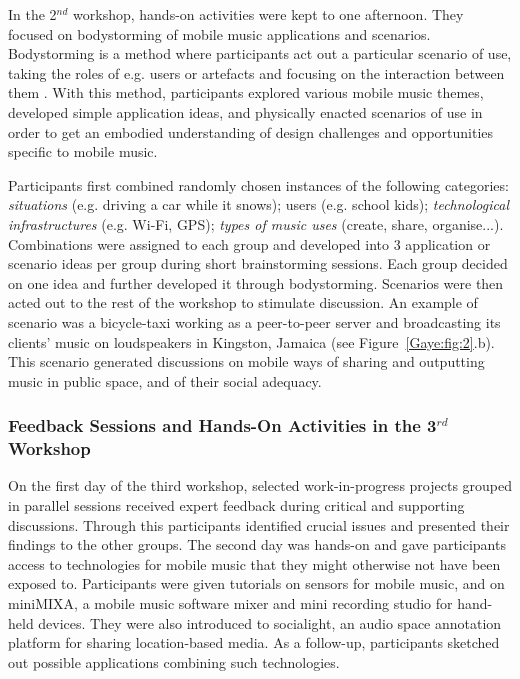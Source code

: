 In the 2$^{nd}$ workshop, hands-on
activities were kept to one afternoon. They focused on bodystorming of mobile
music applications and scenarios. Bodystorming is a method where participants act
out a particular scenario of use, taking the roles of e.g. users or artefacts and
focusing on the interaction between them \cite{Buchenau:2000}. With this method, participants
explored various mobile music themes, developed simple application ideas, and
physically enacted scenarios of use in order to get an embodied understanding of
design challenges and opportunities specific to mobile music.

Participants first combined randomly chosen instances of the following
categories: \textit{situations} (e.g. driving a car while it snows); users (e.g.
school kids); \textit{technological infrastructures} (e.g. Wi-Fi, GPS);
\textit{types of music uses} (create, share, organise...). Combinations were
assigned to each group and developed into 3 application or scenario ideas per
group during short brainstorming sessions. Each group decided on one idea and
further developed it through bodystorming. Scenarios were then acted out to the
rest of the workshop to stimulate discussion. An example of scenario was a
bicycle-taxi working as a peer-to-peer server and broadcasting its clients' music
on loudspeakers in Kingston, Jamaica (see Figure~\ref{Gaye:fig:2}.b). This scenario generated
discussions on mobile ways of sharing and outputting music in public space, and
of their social adequacy.

\subsubsection{Feedback Sessions and Hands-On Activities in the 3$^{rd}$
Workshop}

On the first day of the third workshop, selected work-in-progress projects grouped in parallel sessions received expert feedback during critical and supporting discussions. Through this participants identified crucial issues and presented their findings to the other groups. The second day was hands-on and gave participants access to technologies for mobile music that they might otherwise not have been exposed to. Participants were given tutorials on sensors for mobile music, and on miniMIXA, a mobile music software mixer and mini recording studio for hand-held devices. They were also introduced to socialight, an audio space annotation platform for sharing location-based media. As a follow-up, participants sketched out possible applications combining such technologies.

